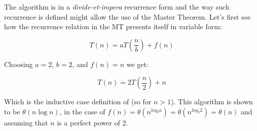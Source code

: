\documentclass[12pt]{article}
\begin{document}
The algorithm is in a \textit{divide-et-impera} recurrence form and the way such recurrence is defined might 
allow the use of the Master Theorem. Let's first see how the recurrence relation in the MT presents itself in variable form: 

\begin{equation}
	T(n) = a T\left( \frac{n}{b} \right) + f(n)
\end{equation}

Choosing $a = 2$, $b = 2$, and $f(n) = n$ we get:

\begin{equation}
	T(n) = 2 T\left( \frac{n}{2} \right) + n
\end{equation}

Which is the inductive case definition of  (so for $n > 1$). This algorithm is shown to be 
$\theta(n \log{n})$, in the case of $f(n) = \theta(n^{log_b{a}}) = \theta(n^{log_2{2}}) = \theta(n)$ and assuming that $n$ is 
a perfect power of $2$.
                                                                                                                                                                                                                                                                     
\end{document}
